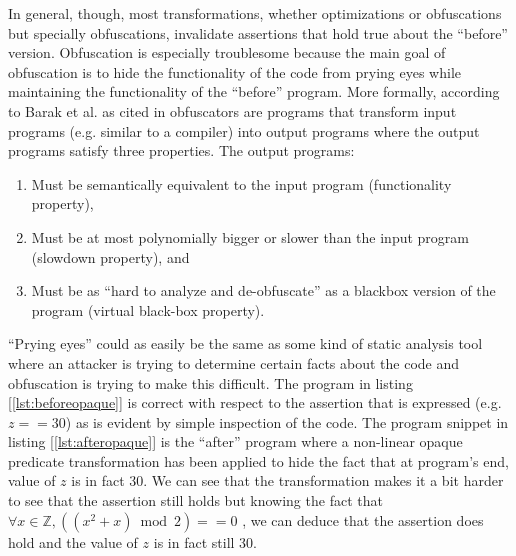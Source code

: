 \documentclass[compsoc,conference,a4paper,10pt,times]{IEEEtran}
\begin{document}
In general, though, most transformations, whether optimizations or obfuscations but specially obfuscations, invalidate assertions that hold true about the ``before'' version. Obfuscation is especially troublesome because the main goal of obfuscation is to hide the functionality of the code from prying eyes while maintaining the functionality of the ``before'' program. More formally, according to Barak et al. as cited in \cite{BanescuCGNP16} obfuscators are programs that transform input programs (e.g. similar to a compiler) into output programs where the output programs satisfy three properties. The output programs:
\begin{enumerate}
   \item Must be semantically equivalent to the input program (functionality property), \label{itm:firstproperty}
   \item Must be at most polynomially bigger or slower than the input program (slowdown property), and \label{itm:secondproperty}
   \item Must be as ``hard to analyze and de-obfuscate'' as a blackbox version of the program (virtual black-box property). \label{itm:thirdproperty}
\end{enumerate}
``Prying eyes'' could as easily be the same as some kind of static analysis tool where an attacker is trying to determine certain facts about the code and obfuscation is trying to make this difficult. The program in listing [\ref{lst:beforeopaque}] is correct with respect to the assertion that is expressed (e.g. $z == 30$) as is evident by simple inspection of the code. The program snippet in listing [\ref{lst:afteropaque}] is the ``after'' program where a non-linear opaque predicate transformation has been applied to hide the fact that at program's end, value of $z$ is in fact 30. We can see that the transformation makes it a bit harder to see that the assertion still holds but knowing the fact that $\forall x \in \mathbb{Z}, ((x^2 + x)\bmod 2) == 0$ , we can deduce that the assertion does hold and the value of $z$ is in fact still 30. 
\end{document}
